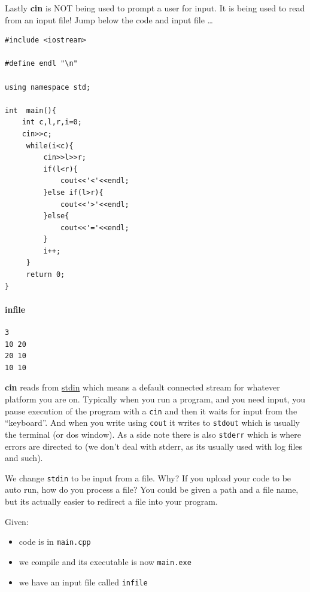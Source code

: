 Lastly \textbf{cin} is NOT being used to prompt a user for input. It is
being used to read from an input file! Jump below the code and input
file \ldots{}

\begin{verbatim}
#include <iostream>

#define endl "\n"

using namespace std;

int  main(){
    int c,l,r,i=0;
    cin>>c;
     while(i<c){
         cin>>l>>r;
         if(l<r){
             cout<<'<'<<endl;
         }else if(l>r){
             cout<<'>'<<endl;
         }else{
             cout<<'='<<endl;
         }
         i++;
     }
     return 0;
}
\end{verbatim}


\hypertarget{infile}{%
\paragraph{infile}\label{infile}}

\begin{verbatim}
3
10 20
20 10
10 10
\end{verbatim}

\textbf{cin} reads from
\href{https://en.wikipedia.org/wiki/Standard_streams}{stdin} which means
a default connected stream for whatever platform you are on. Typically
when you run a program, and you need input, you pause execution of the
program with a \texttt{cin} and then it waits for input from the
``keyboard''. And when you write using \texttt{cout} it writes to
\texttt{stdout} which is usually the terminal (or dos window). As a side
note there is also \texttt{stderr} which is where errors are directed to
(we don't deal with stderr, as its usually used with log files and
such).

We change \texttt{stdin} to be input from a file. Why? If you upload
your code to be auto run, how do you process a file? You could be given
a path and a file name, but its actually easier to redirect a file into
your program.

Given:

\begin{itemize}
\tightlist
\item
  code is in \texttt{main.cpp}
\item
  we compile and its executable is now \texttt{main.exe}
\item
  we have an input file called \texttt{infile}
\end{itemize}

